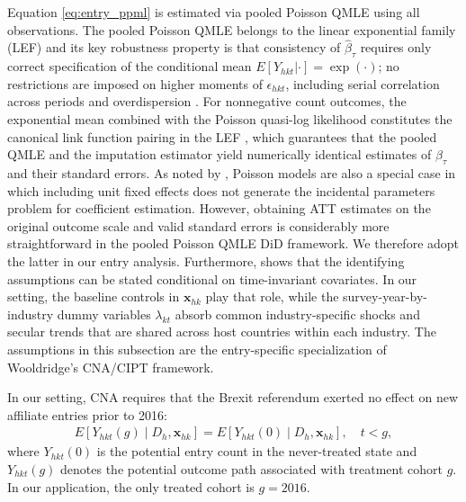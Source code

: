 \documentclass[preprint,11pt,authoryear]{elsarticle}
\begin{document}
Equation \eqref{eq:entry_ppml} is estimated via pooled Poisson QMLE using all observations. 
The pooled Poisson QMLE belongs to the linear exponential family (LEF) and its key robustness property is that consistency of $\hat{\beta}_{\tau}$ requires only correct specification of the conditional mean $E[Y_{hkt}|\cdot] = \exp(\cdot)$; no restrictions are imposed on higher moments of $\epsilon_{hkt}$, including serial correlation across periods and overdispersion \citep{wooldridge2023simple}.
For nonnegative count outcomes, the exponential mean combined with the Poisson quasi-log likelihood constitutes the canonical link function pairing in the LEF \citep[Table 1]{wooldridge2023simple}, which guarantees that the pooled QMLE and the imputation estimator yield numerically identical estimates of $\beta_{\tau}$ and their standard errors.
As noted by \citet{wooldridge2023simple}, Poisson models are also a special case in which including unit fixed effects does not generate the incidental parameters problem for coefficient estimation. However, obtaining ATT estimates on the original outcome scale and valid standard errors is considerably more straightforward in the pooled Poisson QMLE DiD framework. We therefore adopt the latter in our entry analysis.
Furthermore, \citet{wooldridge2023simple} shows that the identifying assumptions can be stated conditional on time-invariant covariates. In our setting, the baseline controls in $\mathbf{x}_{hk}$ play that role, while the survey-year-by-industry dummy variables $\lambda_{kt}$ absorb common industry-specific shocks and secular trends that are shared across host countries within each industry. The assumptions in this subsection are the entry-specific specialization of Wooldridge's CNA/CIPT framework.

In our setting, CNA requires that the Brexit referendum exerted no effect on new affiliate entries prior to 2016:
\begin{align}
E[Y_{hkt}(g) \mid D_h, \mathbf{x}_{hk}] = E[Y_{hkt}(0) \mid D_h, \mathbf{x}_{hk}], \quad t < g,
\end{align}
where $Y_{hkt}(0)$ is the potential entry count in the never-treated state and $Y_{hkt}(g)$ denotes the potential outcome path associated with treatment cohort $g$. In our application, the only treated cohort is $g=2016$. 
\end{document}
